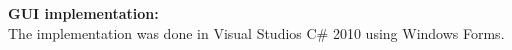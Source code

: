 \textbf{GUI implementation:}\\
The implementation was done in Visual Studios C\# 2010 using Windows Forms.

